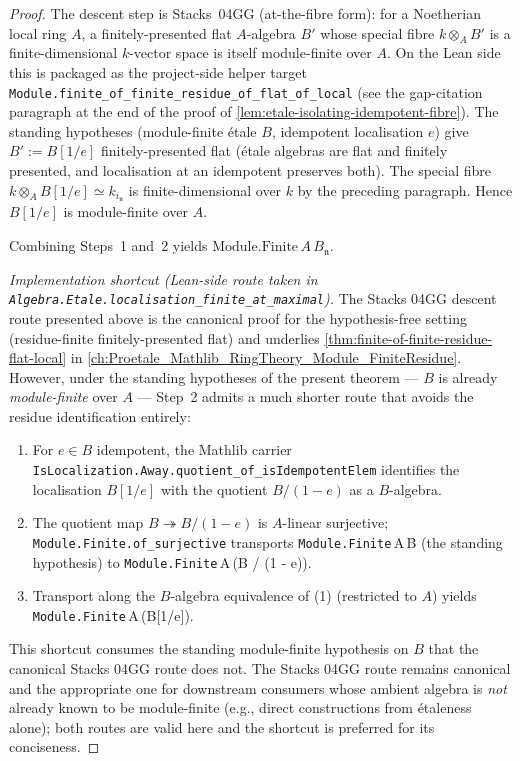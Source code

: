 \begin{proof}
The descent step is Stacks~04GG (at-the-fibre form): for a
Noetherian local ring $A$, a finitely-presented flat $A$-algebra
$B'$ whose special fibre $k \otimes_A B'$ is a finite-dimensional
$k$-vector space is itself module-finite over $A$. On the Lean
side this is packaged as the project-side helper target
\texttt{Module.finite\_of\_finite\_residue\_of\_flat\_of\_local}
(see the gap-citation paragraph at the end of the proof of
\cref{lem:etale-isolating-idempotent-fibre}). The standing
hypotheses (module-finite étale $B$, idempotent localisation $e$)
give $B' := B[1/e]$ finitely-presented flat (étale algebras are
flat and finitely presented, and localisation at an idempotent
preserves both). The special fibre $k \otimes_A B[1/e] \simeq
k_{i_{\mathfrak n}}$ is finite-dimensional over $k$ by the
preceding paragraph. Hence $B[1/e]$ is module-finite over $A$.

Combining Steps~1 and~2 yields
$\mathrm{Module.Finite}\,A\,B_{\mathfrak n}$.

\smallskip
\emph{Implementation shortcut (Lean-side route taken in
\texttt{Algebra.Etale.localisation\_finite\_at\_maximal}).} The Stacks
04GG descent route presented above is the canonical proof for the
hypothesis-free setting (residue-finite finitely-presented flat) and
underlies
\cref{thm:finite-of-finite-residue-flat-local} in
\cref{ch:Proetale_Mathlib_RingTheory_Module_FiniteResidue}. However, under
the standing hypotheses of the present theorem — \(B\) is already
\emph{module-finite} over \(A\) — Step~2 admits a much shorter route
that avoids the residue identification entirely:

\begin{enumerate}
\item For \(e \in B\) idempotent, the Mathlib carrier
  \texttt{IsLocalization.Away.quotient\_of\_isIdempotentElem}
  identifies the localisation \(B[1/e]\) with the quotient
  \(B / (1 - e)\) as a \(B\)-algebra.
\item The quotient map \(B \twoheadrightarrow B / (1 - e)\) is
  \(A\)-linear surjective; \texttt{Module.Finite.of\_surjective}
  transports \texttt{Module.Finite}\,A\,B (the standing hypothesis)
  to \texttt{Module.Finite}\,A\,(B / (1 - e)).
\item Transport along the \(B\)-algebra equivalence of (1)
  (restricted to \(A\)) yields
  \texttt{Module.Finite}\,A\,(B[1/e]).
\end{enumerate}

This shortcut consumes the standing module-finite hypothesis on \(B\)
that the canonical Stacks 04GG route does not. The Stacks 04GG route
remains canonical and the appropriate one for downstream consumers
whose ambient algebra is \emph{not} already known to be module-finite
(e.g., direct constructions from étaleness alone); both routes are
valid here and the shortcut is preferred for its conciseness.
\end{proof}

